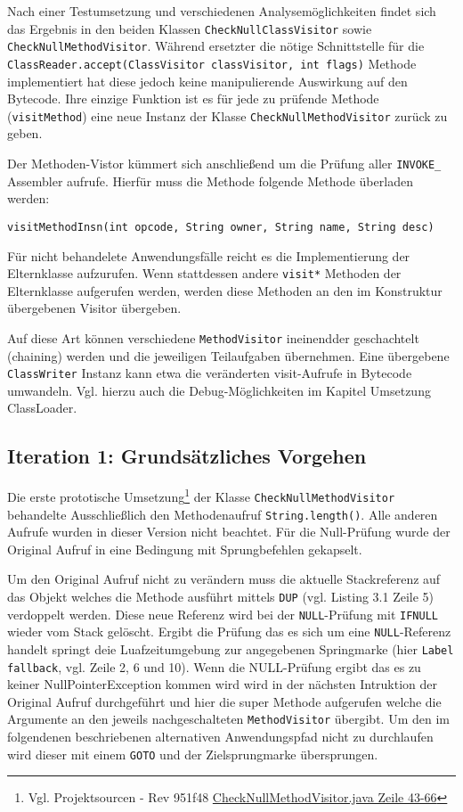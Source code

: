 Nach einer Testumsetzung und verschiedenen Analysemöglichkeiten findet sich
das Ergebnis in den beiden Klassen \texttt{CheckNullClassVisitor} sowie
\texttt{CheckNullMethodVisitor}. Während ersetzter die nötige Schnittstelle für die
\texttt{ClassReader.accept(ClassVisitor classVisitor, int flags)} Methode implementiert
hat diese jedoch keine manipulierende Auswirkung auf den Bytecode. Ihre
einzige Funktion ist es für jede zu prüfende Methode (\texttt{visitMethod})
eine neue Instanz der Klasse \texttt{CheckNullMethodVisitor} zurück zu geben.

Der Methoden-Vistor kümmert sich anschließend um die Prüfung aller \texttt{INVOKE\_\*}
Assembler aufrufe. Hierfür muss die Methode folgende Methode überladen werden:

\texttt{visitMethodInsn(int opcode, String owner, String name, String desc)}

Für nicht behandelete Anwendungsfälle reicht es die Implementierung der Elternklasse
aufzurufen. Wenn stattdessen andere \texttt{visit*} Methoden der Elternklasse aufgerufen
werden, werden diese Methoden an den im Konstruktur übergebenen Visitor übergeben.

Auf diese Art können verschiedene \texttt{MethodVisitor} ineinendder geschachtelt
(chaining) werden und die jeweiligen Teilaufgaben übernehmen. Eine übergebene \texttt{ClassWriter}
Instanz kann etwa die veränderten visit-Aufrufe in Bytecode umwandeln. Vgl. hierzu
auch die Debug-Möglichkeiten im Kapitel Umsetzung ClassLoader.

\subsection{Iteration 1: Grundsätzliches Vorgehen}

Die erste prototische Umsetzung\footnote{Vgl. Projektsourcen - Rev 951f48 \href{https://github.com/jerolimov/java-hardener/blob/951f48194f53baebd0915c01e0ed3cc2596bd0db/src/main/java/de/fhkoeln/gm/cui/javahardener/CheckNullMethodVisitor.java\#L43-66}{CheckNullMethodVisitor.java Zeile 43-66}} der Klasse \texttt{CheckNullMethodVisitor} behandelte Ausschließlich
den Methodenaufruf \texttt{String.length()}. Alle anderen Aufrufe wurden
in dieser Version nicht beachtet. Für die Null-Prüfung wurde der Original Aufruf
in eine Bedingung mit Sprungbefehlen gekapselt.

Um den Original Aufruf nicht zu verändern muss die aktuelle Stackreferenz
auf das Objekt welches die Methode ausführt mittels \texttt{DUP} (vgl. Listing 3.1 Zeile 5)
verdoppelt werden. Diese neue Referenz wird bei der \texttt{NULL}-Prüfung mit
\texttt{IFNULL} wieder vom Stack gelöscht. Ergibt die Prüfung das es sich um
eine \texttt{NULL}-Referenz handelt springt deie Luafzeitumgebung zur
angegebenen Springmarke (hier \texttt{Label fallback}, vgl. Zeile 2, 6 und 10).
Wenn die NULL-Prüfung ergibt das es zu keiner NullPointerException kommen
wird wird in der nächsten Intruktion der Original Aufruf durchgeführt
und hier die super Methode aufgerufen welche die Argumente an den jeweils
nachgeschalteten \texttt{MethodVisitor} übergibt.
Um den im folgendenen beschriebenen alternativen Anwendungspfad nicht
zu durchlaufen wird dieser mit einem \texttt{GOTO} und der Zielsprungmarke
übersprungen.

